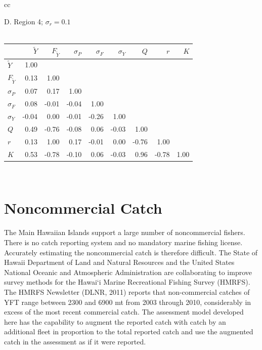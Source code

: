\documentclass[12pt,letterpaper]{article}
\newcommand\MSY{\widetilde{Y}}
\newcommand\Fmsy{F_{\MSY}}
\begin{document}
\begin{table}
\begin{tabular}[h]{cc}
\begin{minipage}[t]{0.5\textwidth}
\begin{center}
{\normalsize D. Region 4; $\sigma_r = 0.1$}\\
~\\
\begin{tabular}{|lrrrrrrrr|}
\hline
&$\MSY$&$\Fmsy$&$\sigma_P$&$\sigma_F$&$\sigma_Y$&$Q$&$r$&$K$\\
\hline
$\MSY$&1.00&&&&&&&\\
$\Fmsy$&0.13&1.00&&&&&&\\
$\sigma_P$&0.07&0.17&1.00&&&&&\\
$\sigma_F$&0.08&-0.01&-0.04&1.00&&&&\\
$\sigma_Y$&-0.04&0.00&-0.01&-0.26&1.00&&&\\
$Q$&0.49&-0.76&-0.08&0.06&-0.03&1.00&&\\
$r$&0.13&1.00&0.17&-0.01&0.00&-0.76&1.00&\\
$K$&0.53&-0.78&-0.10&0.06&-0.03&0.96&-0.78&1.00\\
\hline
\end{tabular}
\end{center}
      \end{minipage}\\
   \end{tabular}%
\end{table}


\clearpage
\section{Noncommercial Catch}
\label{sec:klingon}
The Main Hawaiian Islands support a large number of noncommercial
fishers. There is no catch reporting system and no mandatory marine fishing
license. 
Accurately estimating the noncommercial catch is therefore difficult. 
The State of Hawaii Department of Land and Natural Resources and the
United States National Oceanic and Atmospheric Administration are  
collaborating to improve survey methods for the Hawai`i Marine
Recreational Fishing Survey (HMRFS). The HMRFS Newsletter (DLNR, 2011)
reports that non-commercial catches of YFT range between 2300 and 6900
mt from 2003 through 2010, considerably in excess of the most recent
commercial catch. The assessment model developed here has the capability to
augment the reported catch with catch by an additional fleet in
proportion to the total reported catch and use the augmented catch in
the assessment as if it were reported.
\end{document}
